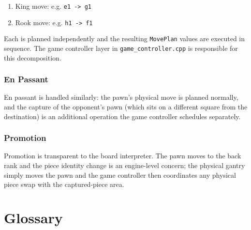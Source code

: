 \documentclass[11pt,a4paper]{report}
\begin{document}
\begin{enumerate}[noitemsep]
    \item King move: e.g. \texttt{e1 -> g1}
    \item Rook move: e.g. \texttt{h1 -> f1}
\end{enumerate}

Each is planned independently and the resulting \texttt{MovePlan} values are executed in sequence. The game controller layer in \texttt{game\_controller.cpp} is responsible for this decomposition.

\subsection{En Passant}

En passant is handled similarly: the pawn's physical move is planned normally, and the capture of the opponent's pawn (which sits on a different square from the destination) is an additional operation the game controller schedules separately.

\subsection{Promotion}

Promotion is transparent to the board interpreter. The pawn moves to the back rank and the piece identity change is an engine-level concern; the physical gantry simply moves the pawn and the game controller then coordinates any physical piece swap with the captured-piece area.

\appendix
\chapter{Glossary}
\end{document}
